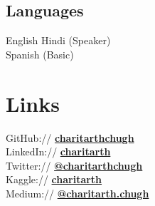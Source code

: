 \documentclass[]{resume-template}
\begin{document}
\begin{minipage}[t]{0.33\textwidth}
    \subsection{Languages}
    English \textbullet{} Hindi (Speaker)\\
    Spanish (Basic)


    \section{Links}\label{sec:links}
    GitHub:// \href{https://github.com/charitarthchugh}{\textbf {charitarthchugh}} \\
    LinkedIn:// \href{https:///www.linkedin.com/in/charitarth}{\textbf {charitarth}} \\
    Twitter:// \href{https://twitter.com/charitarthchugh}{\textbf{@charitarthchugh}}\\
    Kaggle:// \href{https://kaggle.com/charitarth}{\textbf{charitarth}}\\
    Medium:// \href{https://medium.com/@charitarth.chugh}{\textbf{@charitarth.chugh}}\\

\end{minipage}
\hfill
\end{document}
